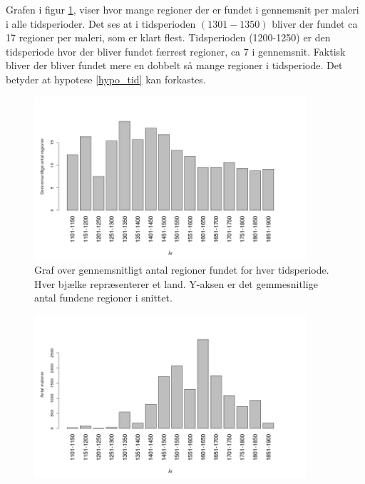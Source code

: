 {Grafen i figur \ref{naiv_year}, viser hvor mange regioner der
er fundet i gennemsnit per maleri i alle tidsperioder. Det ses at i
tidsperioden $(1301-1350)$ bliver der fundet ca 17 regioner per maleri,
som er klart flest. Tidsperioden (1200-1250) er den tidsperiode hvor der
bliver fundet færrest regioner, ca 7 i gennemsnit. Faktisk bliver der bliver fundet
mere en dobbelt så mange regioner i tidsperiode. Det betyder at
hypotese \ref{hypo_tid} kan forkastes.

\begin{figure}[!h]
	\begin{center}
		\includegraphics[angle=0,width=0.90\textwidth]{afsnit/resultater/billeder/yearcut.png}
	\end{center}
	\caption{Graf over gennemsnitligt antal regioner fundet for hver
       tidsperiode. Hver bjælke repræsenterer et land. Y-aksen er
       det gemmesnitlige antal fundene regioner i snittet.}
	\label{naiv_year}
\end{figure}

\begin{figure}[!h]
	\begin{center}
		\includegraphics[angle=0,width=0.90\textwidth]{afsnit/resultater/billeder/yearNrImage.png}
	\end{center}
	\caption{}
	\label{naiv_yearNrImage}
\end{figure}

}
